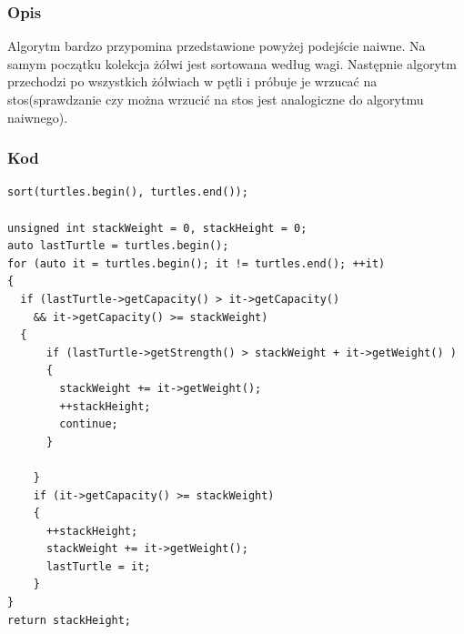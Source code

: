 \documentclass[11pt,a4paper]{article}
\begin{document}
\subsubsection{Opis}
Algorytm bardzo przypomina przedstawione powyżej podejście naiwne. Na samym początku kolekcja żółwi jest sortowana według wagi. Następnie algorytm przechodzi po wszystkich żółwiach w pętli i próbuje je wrzucać na stos(sprawdzanie czy można wrzucić na stos jest analogiczne do algorytmu naiwnego).

\subsubsection{Kod}
\begin{lstlisting}
sort(turtles.begin(), turtles.end());

unsigned int stackWeight = 0, stackHeight = 0;
auto lastTurtle = turtles.begin();
for (auto it = turtles.begin(); it != turtles.end(); ++it)
{
  if (lastTurtle->getCapacity() > it->getCapacity() 
    && it->getCapacity() >= stackWeight)
  {
      if (lastTurtle->getStrength() > stackWeight + it->getWeight() )
      {
        stackWeight += it->getWeight();
        ++stackHeight;
        continue;
      }
			
    }
    if (it->getCapacity() >= stackWeight)
    {
      ++stackHeight;
      stackWeight += it->getWeight();
      lastTurtle = it;
    }
}
return stackHeight;
\end{lstlisting}
\end{document}
